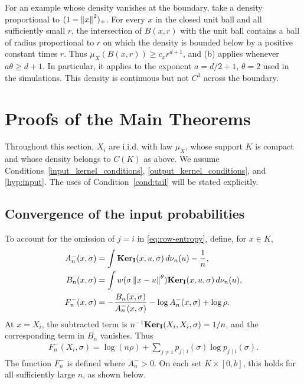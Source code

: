 For an example whose density vanishes at the boundary, take a density proportional to $(1-\left\lVert x\right\rVert^2)_+$. For every $x$ in the closed unit ball and all sufficiently small $r$, the intersection of $B(x,r)$ with the unit ball contains a ball of radius proportional to $r$ on which the density is bounded below by a positive constant times $r$. Thus $\mu_X(B(x,r))\geq c_xr^{d+1}$, and (b) applies whenever $a\theta\geq d+1$. In particular, it applies to the exponent $a=d/2+1$, $\theta=2$ used in the simulations. This density is continuous but not $C^1$ across the boundary.

\section{Proofs of the Main Theorems}\label{tsne:sec:proofs}
Throughout this section, $X_i$ are i.i.d. with law $\mu_X$, whose support $K$ is compact and whose density belongs to $C(K)$ as above. We assume Conditions~\ref{input_kernel_conditions}, \ref{output_kernel_conditions}, and \ref{hyp:input}. The uses of Condition~\ref{cond:tail} will be stated explicitly.

\subsection{Convergence of the input probabilities}\label{tsne:sec:input_kernel_convergence}
To account for the omission of $j=i$ in \eqref{eq:row-entropy}, define, for $x\in K$,
\begin{align}\label{eq:leave-one-out}
A_n^-(x,\sigma)&=\int\mathbf{Ker}_{\mathbf{I}}(x,u,\sigma)\,d\nu_n(u)-\frac1n,\\
B_n(x,\sigma)&=\int w(\sigma\left\lVert x-u\right\rVert^\theta)\mathbf{Ker}_{\mathbf{I}}(x,u,\sigma)\,d\nu_n(u),\\
F_n^-(x,\sigma)&=-\frac{B_n(x,\sigma)}{A_n^-(x,\sigma)}
-\log A_n^-(x,\sigma)+\log\rho.\label{eq:empirical-entropy}
\end{align}
At $x=X_i$, the subtracted term is $n^{-1}\mathbf{Ker}_{\mathbf{I}}(X_i,X_i,\sigma)=1/n$, and the corresponding term in $B_n$ vanishes. Thus
\begin{align}\label{eq:finite-entropy-identity}
F_n^-(X_i,\sigma)=\log(n\rho)
+\sum_{j\ne i}p_{j\mid i}(\sigma)\log p_{j\mid i}(\sigma).
\end{align}
The function $F_n^-$ is defined where $A_n^->0$. On each set $K\times[0,b]$, this holds for all sufficiently large $n$, as shown below.

